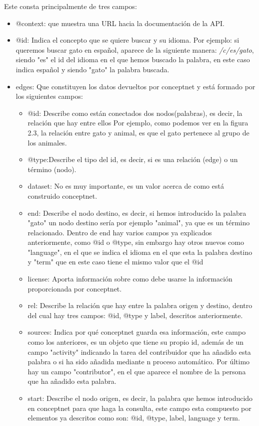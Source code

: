 Este consta principalmente de tres campos:
\begin{itemize}
	\item @context: que muestra una URL hacia la documentación de la API.
	\item @id: Indica el concepto que se quiere buscar y su idioma. Por ejemplo: si queremos buscar gato en español, aparece de la siguiente manera: \textit{/c/es/gato}, siendo "es" el id del idioma en el que hemos buscado la palabra, en este caso indica español y siendo "gato" la palabra buscada.
	\item edges: Que constituyen los datos devueltos por conceptnet y está formado por los siguientes campos:
	\begin{itemize}
		\item @id: Describe como están conectados dos nodos(palabras), es decir, la relación que hay entre ellos Por ejemplo, como podemos ver en la figura 2.3, la relación entre gato y animal, es que el gato pertenece al grupo de los animales.
		\item @type:Describe el tipo del id, es decir, si es una relación (edge) o un término (nodo).
		\item dataset: No es muy importante, es un valor acerca de como está construido conceptnet.
		\item end: Describe el nodo destino, es decir, si hemos introducido la palabra "gato" un nodo destino sería por ejemplo "animal", ya que es un término relacionado. Dentro de end hay varios campos ya explicados anteriormente, como @id o @type, sin embargo hay otros nuevos como "language", en el que se indica el idioma en el que esta la palabra destino y "term" que en este caso tiene el mismo valor que el @id
		\item license: Aporta información sobre como debe usarse la información proporcionada por conceptnet.
		\item rel: Describe la relación que hay entre la palabra origen y destino, dentro del cual hay tres campos: @id, @type y label, descritos anteriormente.
		\item sources: Indica por qué conceptnet guarda esa información, este campo como los anteriores, es un objeto que tiene su propio id, además de un campo "activity" indicando la tarea del contribuidor que ha añadido esta palabra o si ha sido añadida mediante n proceso automático. Por último hay un campo "contributor", en el que aparece el nombre de la persona que ha añadido esta palabra.
		\item start: Describe el nodo origen, es decir, la palabra que hemos introducido en conceptnet para que haga la consulta, este campo esta compuesto por elementos ya descritos como son: @id, @type, label, language y term.

\end{itemize}
\end{itemize}
